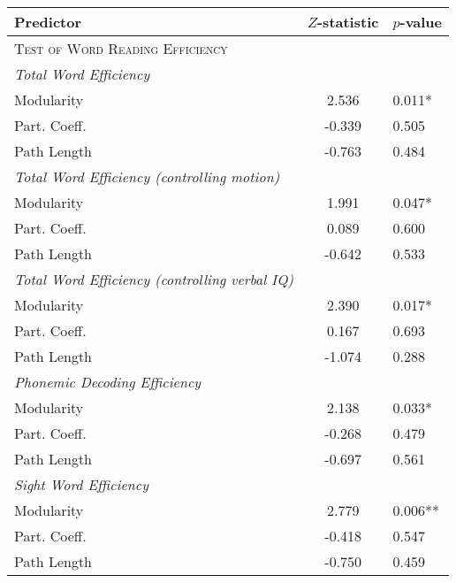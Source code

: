 \begin{tabular}{lcl}
\toprule
Predictor   &  $Z$-statistic &  $p$-value \\
\midrule
\textsc{Test of Word Reading Efficiency} & & \\
\textit{Total Word Efficiency} & & \\
    \hspace{5pt}Modularity &  2.536 &  0.011* \\
    \hspace{5pt}Part. Coeff. & -0.339 &  0.505 \\
    \hspace{5pt}Path Length & -0.763 &  0.484 \\
\textit{Total Word Efficiency (controlling motion)} & & \\
    \hspace{5pt}Modularity  &  1.991 &  0.047* \\
    \hspace{5pt}Part. Coeff. &  0.089 &  0.600 \\
    \hspace{5pt}Path Length & -0.642 &  0.533 \\
\textit{Total Word Efficiency (controlling verbal IQ)} & & \\
    \hspace{5pt}Modularity  &  2.390 &  0.017* \\
    \hspace{5pt}Part. Coeff. &  0.167 &  0.693 \\
    \hspace{5pt}Path Length & -1.074 &  0.288 \\
\textit{Phonemic Decoding Efficiency} & & \\
    \hspace{5pt}Modularity  &  2.138 &  0.033* \\
    \hspace{5pt}Part. Coeff. & -0.268 &  0.479 \\
    \hspace{5pt}Path Length & -0.697 &  0.561 \\
\textit{Sight Word Efficiency} & & \\
    \hspace{5pt}Modularity  &  2.779 &  0.006** \\
    \hspace{5pt}Part. Coeff. & -0.418 &  0.547 \\
    \hspace{5pt}Path Length & -0.750 &  0.459 \\

\bottomrule
\end{tabular}
